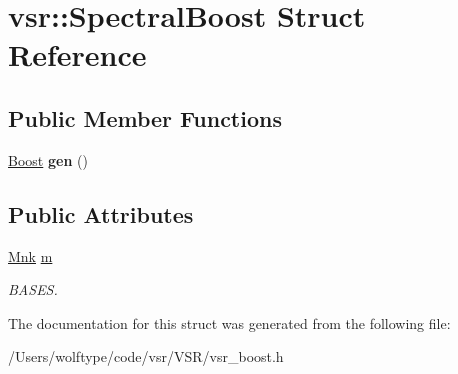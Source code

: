 \hypertarget{structvsr_1_1_spectral_boost}{\section{vsr\-:\-:Spectral\-Boost Struct Reference}
\label{structvsr_1_1_spectral_boost}
}
\subsection*{Public Member Functions}
\begin{DoxyCompactItemize}
\item 
\hypertarget{structvsr_1_1_spectral_boost_a2f5b5d0d0d51c782da0dbfcf151d77fe}{\hyperlink{classvsr_1_1_boost}{Boost} {\bfseries gen} ()}\label{structvsr_1_1_spectral_boost_a2f5b5d0d0d51c782da0dbfcf151d77fe}

\end{DoxyCompactItemize}
\subsection*{Public Attributes}
\begin{DoxyCompactItemize}
\item 
\hypertarget{structvsr_1_1_spectral_boost_ad237c7a52ada14936f268bb701a1b947}{\hyperlink{namespacevsr_ace9d2714a493810090e61420d6a688c6}{Mnk} \hyperlink{structvsr_1_1_spectral_boost_ad237c7a52ada14936f268bb701a1b947}{m}}\label{structvsr_1_1_spectral_boost_ad237c7a52ada14936f268bb701a1b947}

\begin{DoxyCompactList}\small\item\em B\-A\-S\-E\-S. \end{DoxyCompactList}\end{DoxyCompactItemize}


The documentation for this struct was generated from the following file\-:\begin{DoxyCompactItemize}
\item 
/\-Users/wolftype/code/vsr/\-V\-S\-R/vsr\-\_\-boost.\-h\end{DoxyCompactItemize}
